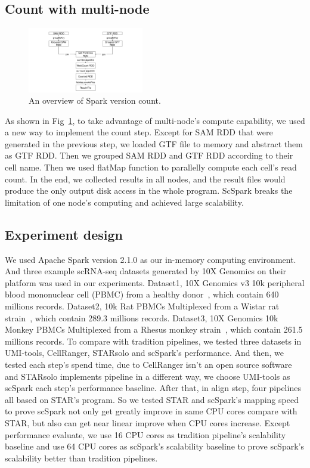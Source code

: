 \documentclass[10pt,journal,compsoc]{IEEEtran}
\begin{document}
\subsection{Count with multi-node}
\begin{figure}
	\includegraphics[width=0.45\textwidth]{fig3.pdf}
	\caption{An overview of Spark version count.} \label{fig3}
\end{figure}
As shown in Fig~\ref{fig3}, to take advantage of multi-node's compute capability, we used a new way to implement the count step. 
Except for SAM RDD that were generated in the previous step, we loaded GTF file to memory and abstract them as GTF RDD. 
Then we grouped SAM RDD and GTF RDD according to their cell name. 
Then we used flatMap function to parallelly compute each cell's read count. 
In the end, we collected results in all nodes, and the result files would produce the only output disk access in the whole program. 
ScSpark breaks the limitation of one node's computing and achieved large scalability. 

\subsection{Experiment design}
We used Apache Spark version 2.1.0 as our in-memory computing environment.
And three example scRNA-seq datasets generated by 10X Genomics on their platform was used in our experiments.
Dataset1, 10X Genomics v3 10k peripheral blood mononuclear cell (PBMC) from a healthy donor~\cite{ref_url4}, which contain 640 millions records.
Dataset2, 10k Rat PBMCs Multiplexed from a  Wistar rat strain~\cite{ref_url7}, which contain 289.3 millions records.
Dataset3, 10X Genomics 10k Monkey PBMCs Multiplexed from a Rhesus monkey strain~\cite{ref_url8}, which contain 261.5 millions records.
To compare with tradition pipelines, we tested three datasets in UMI-tools, CellRanger, STARsolo and scSpark's performance.
And then, we tested each step's spend time, due to CellRanger isn't an open source software and STARsolo implements pipeline in a different way, we choose UMI-tools as scSpark each step's performance baseline.
After that, in align step, four pipelines all based on STAR's program.
So we tested STAR and scSpark's mapping speed to prove scSpark not only get greatly improve in same CPU cores compare with STAR, but also can get near linear improve when CPU cores increase.
Except performance evaluate, we use 16 CPU cores as tradition pipeline's scalability baseline and use 64 CPU cores as scSpark's scalability baseline to prove scSpark's scalability better than tradition pipelines.
\end{document}
